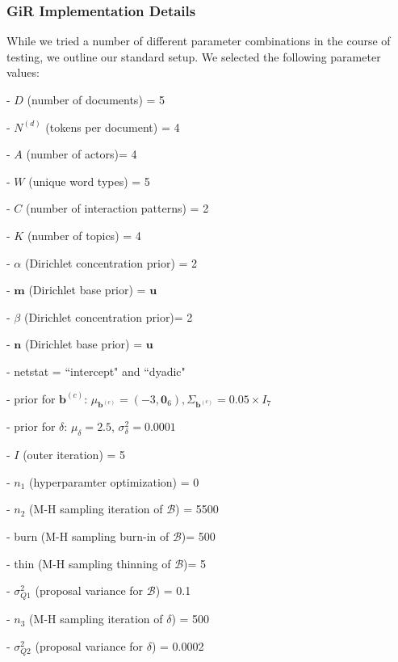 \documentclass[a4paper]{article}
\begin{document}
        \subsubsection{GiR Implementation Details} \label{subsubsec: GiR implementation}
        While we tried a number of different parameter combinations in the course of testing, we outline our standard setup. We selected the following parameter values:
        \begin{itemize}
        	\begin{minipage}{0.49\textwidth}
        		\item[-] $D$ (number of documents) = 5
        		\item[-] $N^{(d)}$ (tokens per document) = 4
        		\item[-] $A$ (number of actors)= 4
        		\item[-] $W$ (unique word types) = 5
        		\item[-] $C$ (number of interaction patterns) = 2
        		\item[-] $K$ (number of topics) = 4
        		\item[-] $\alpha$ (Dirichlet concentration prior) = 2
        		\item[-] $\boldsymbol{m}$ (Dirichlet base prior) = $\boldsymbol{u}$ 
        		\item[-] $\beta$ (Dirichlet concentration prior)= 2
        		\item[-] $\boldsymbol{n}$ (Dirichlet base prior) = $\boldsymbol{u}$
        		\item[-] netstat = ``intercept" and ``dyadic"
        	\end{minipage}
        	\begin{minipage}{0.49\textwidth}
        		\item[-] prior for $\boldsymbol{b}^{(c)}$: $\mu_{\boldsymbol{b}^{(c)}} = (-3,\boldsymbol{0}_6), \Sigma_{\boldsymbol{b}^{(c)}} = 0.05\times I_7$
        		\item[-] prior for $\delta$: $\mu_\delta = 2.5$, $\sigma^2_\delta = 0.0001$
        		\item[-] $I$ (outer iteration) = 5
        		\item[-] $n_1$ (hyperparamter optimization) = 0
        		\item[-] $n_2$ (M-H sampling iteration of $\mathcal{B}$) = 5500
        		\item[-] burn (M-H sampling burn-in of $\mathcal{B}$)= 500
        		\item[-] thin (M-H sampling thinning of $\mathcal{B}$)= 5
        		\item[-] $\sigma_{Q1}^2$ (proposal variance for $\mathcal{B}$) = 0.1
        		\item[-] $n_3$ (M-H sampling iteration of $\delta$) = 500
        		\item[-] $\sigma_{Q2}^2$ (proposal variance for $\delta$) = 0.0002
        	\end{minipage}
        \end{itemize}        
     
\end{document}
